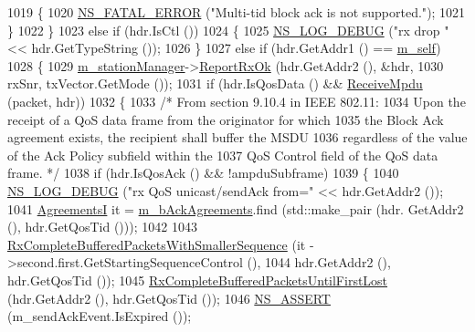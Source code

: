 \begin{DoxyCode}
1019         \{
1020           \hyperlink{group__fatal_ga5131d5e3f75d7d4cbfd706ac456fdc85}{NS\_FATAL\_ERROR} (\textcolor{stringliteral}{"Multi-tid block ack is not supported."});
1021         \}
1022     \}
1023   \textcolor{keywordflow}{else} \textcolor{keywordflow}{if} (hdr.IsCtl ())
1024     \{
1025       \hyperlink{group__logging_ga413f1886406d49f59a6a0a89b77b4d0a}{NS\_LOG\_DEBUG} (\textcolor{stringliteral}{"rx drop "} << hdr.GetTypeString ());
1026     \}
1027   \textcolor{keywordflow}{else} \textcolor{keywordflow}{if} (hdr.GetAddr1 () == \hyperlink{classns3_1_1MacLow_a23004ca5405c82111f5b20eec03b3d9a}{m\_self})
1028     \{
1029       \hyperlink{classns3_1_1MacLow_a1c7f45f071f9e5eb97764f64e5cdaf1b}{m\_stationManager}->\hyperlink{classns3_1_1WifiRemoteStationManager_a58e79dd3960c03fdd28ee8c0dde03d8f}{ReportRxOk} (hdr.GetAddr2 (), &hdr,
1030                                     rxSnr, txVector.GetMode ());
1031       \textcolor{keywordflow}{if} (hdr.IsQosData () && \hyperlink{classns3_1_1MacLow_a372fe3a76617f1aefa4918f4b1541e88}{ReceiveMpdu} (packet, hdr))
1032         \{
1033           \textcolor{comment}{/* From section 9.10.4 in IEEE 802.11:}
1034 \textcolor{comment}{             Upon the receipt of a QoS data frame from the originator for which}
1035 \textcolor{comment}{             the Block Ack agreement exists, the recipient shall buffer the MSDU}
1036 \textcolor{comment}{             regardless of the value of the Ack Policy subfield within the}
1037 \textcolor{comment}{             QoS Control field of the QoS data frame. */}
1038           \textcolor{keywordflow}{if} (hdr.IsQosAck () && !ampduSubframe)
1039             \{
1040               \hyperlink{group__logging_ga413f1886406d49f59a6a0a89b77b4d0a}{NS\_LOG\_DEBUG} (\textcolor{stringliteral}{"rx QoS unicast/sendAck from="} << hdr.GetAddr2 ());
1041               \hyperlink{classns3_1_1MacLow_a7876cc9b328cdb0508f2a7b7647eab10}{AgreementsI} it = \hyperlink{classns3_1_1MacLow_a53482df1a7e6f136cfa8ce50fa10adc2}{m\_bAckAgreements}.find (std::make\_pair (hdr.
      GetAddr2 (), hdr.GetQosTid ()));
1042 
1043               \hyperlink{classns3_1_1MacLow_aaed81a6cbf94baf2b2f17b9f96b8474d}{RxCompleteBufferedPacketsWithSmallerSequence} (it
      ->second.first.GetStartingSequenceControl (),
1044                                                             hdr.GetAddr2 (), hdr.GetQosTid ());
1045               \hyperlink{classns3_1_1MacLow_aeadf392d37d323fb81f0ef0766f2359a}{RxCompleteBufferedPacketsUntilFirstLost} (hdr.GetAddr2 
      (), hdr.GetQosTid ());
1046               \hyperlink{assert_8h_a6dccdb0de9b252f60088ce281c49d052}{NS\_ASSERT} (m\_sendAckEvent.IsExpired ());

\end{DoxyCode}

